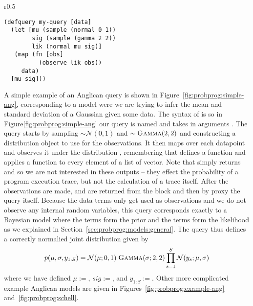 \begin{wrapfigure}{r}{0.5\textwidth}
	\centering 
	\begin{lstlisting}[basicstyle=\ttfamily\small]
(defquery my-query [data]
  (let [mu (sample (normal 0 1))
        sig (sample (gamma 2 2))
        lik (normal mu sig)]
   (map (fn [obs]
          (observe lik obs))
     data)
  [mu sig]))
	\end{lstlisting}	
	\vspace{-5pt}
	\caption{A simple Anglican query.\label{fig:probprog:simple-ang}}
	\vspace{-10pt}
\end{wrapfigure}
A simple example of an Anglican query is shown in Figure~\ref{fig:probprog:simple-ang},
corresponding to a model were we are trying to infer the mean and standard deviation
of a Gaussian given some data.  The syntax of  is {\small {}}
so in Figure\ref{fig:probprog:simple-ang} our query is named {\small {}} and takes
in arguments {\small {}}.  The query starts by sampling {\small {}}$\sim\mathcal{N}(0,1)$
and {\small {}}$\sim\textsc{Gamma}(2,2)$ and constructing a distribution object {\small {}}
to use for the observations.  It then maps over each datapoint and observes it under the distribution
{\small {}}, remembering that {\small {}} defines a function and \map applies a function
to every element of a list of vector.  
Note that \observe simply returns {\small {}} and so we
are not interested in these outputs -- they effect the probability of a program execution trace, but
not the calculation of a trace itself.  After the observations are made, {\small {}} and {\small {}}
are returned from the \cllet block and then by proxy the query itself.
Because the data terms only get used as observations and we do
not observe any internal random variables, this query corresponds exactly to a Bayesian model where
the \sample terms form the prior and the \observe terms form the likelihood as we explained in
Section~\ref{sec:probprog:models:general}.  The query thus defines a correctly normalied joint
distribution given by
\begin{align}
p(\mu,\sigma,y_{1:S}) = \mathcal{N}(\mu ; 0,1) \; \textsc{Gamma}(\sigma ; 2, 2) \prod_{s=1}^{S} \mathcal{N}(y_s ; \mu, \sigma)
\end{align}
where we have defined $\mu:=${\small {}}, $sig:=${\small {}}, and $y_{1:S}:=${\small {}}.
Other more complicated example Anglican models are given in Figures~\ref{fig:probprog:example-ang}
and~\ref{fig:probprog:schell}.

